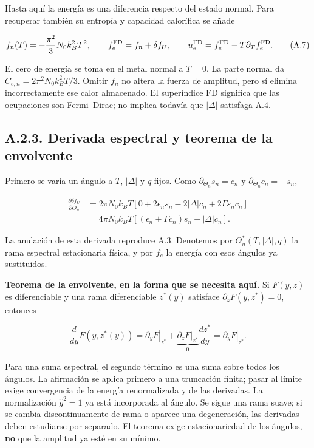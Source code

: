\documentclass[
  spanish,
  10pt,
  a4paper,
]{article}
\begin{document}
Hasta aquí la energía es una diferencia respecto del estado normal. Para
recuperar también su entropía y capacidad calorífica se añade

\[
f_n(T)=-\frac{\pi^2}{3}N_0 k_B^2T^2,
\qquad f_e^{\rm FD}=f_n+\delta f_U,
\qquad u_e^{\rm FD}=f_e^{\rm FD}-T\partial_Tf_e^{\rm FD}.
\tag{A.7}
\]

El cero de energía se toma en el metal normal a \(T=0\). La parte normal
da \(C_{e,n}=2\pi^2N_0k_B^2T/3\). Omitir \(f_n\) no altera la fuerza de
amplitud, pero sí elimina incorrectamente ese calor almacenado. El
superíndice FD significa que las ocupaciones son Fermi--Dirac; no
implica todavía que \(|\Delta|\) satisfaga A.4.

\subsection{A.2.3. Derivada espectral y teorema de la
envolvente}\label{a.2.3.-derivada-espectral-y-teorema-de-la-envolvente}

Primero se varía un ángulo a \(T\), \(|\Delta|\) y \(q\) fijos. Como
\(\partial_{\Theta_n}s_n=c_n\) y \(\partial_{\Theta_n}c_n=-s_n\),

\[
\begin{aligned}
\frac{\partial\delta f_U}{\partial\Theta_n}
&=2\pi N_0k_BT\left[0+2\epsilon_ns_n-2|\Delta|c_n
+2\Gamma s_nc_n\right]\\
&=4\pi N_0k_BT\left[(\epsilon_n+\Gamma c_n)s_n-|\Delta|c_n\right].
\end{aligned}
\tag{A.8a}
\]

La anulación de esta derivada reproduce A.3. Denotemos por
\(\Theta_n^*(T,|\Delta|,q)\) la rama espectral estacionaria física, y
por \(\bar f_e\) la energía con esos ángulos ya sustituidos.

\textbf{Teorema de la envolvente, en la forma que se necesita aquí.} Si
\(F(y,z)\) es diferenciable y una rama diferenciable \(z^*(y)\)
satisface \(\partial_zF(y,z^*)=0\), entonces

\[
\frac{d}{dy}F(y,z^*(y))
=\left.\partial_yF\right|_{z^*}
+\underbrace{\left.\partial_zF\right|_{z^*}}_{0}
\frac{dz^*}{dy}
=\left.\partial_yF\right|_{z^*}.
\tag{A.8b}
\]

Para una suma espectral, el segundo término es una suma sobre todos los
ángulos. La afirmación se aplica primero a una truncación finita; pasar
al límite exige convergencia de la energía renormalizada y de las
derivadas. La normalización \(\hat g^2=1\) ya está incorporada al
ángulo. Se sigue una rama suave; si se cambia discontinuamente de rama o
aparece una degeneración, las derivadas deben estudiarse por separado.
El teorema exige estacionariedad de los ángulos, \textbf{no} que la
amplitud ya esté en su mínimo.
\end{document}
